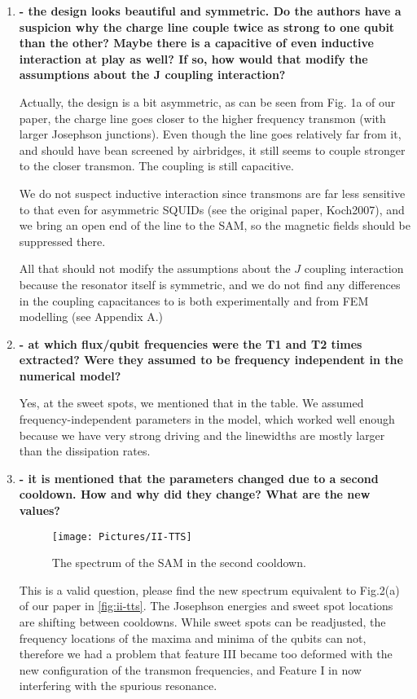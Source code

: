\documentclass{article}
\begin{document}
\begin{enumerate}
	\item \textbf{- the design looks beautiful and symmetric. Do the authors have a
	suspicion why the charge line couple twice as strong to one qubit than
	the other? Maybe there is a capacitive of even inductive interaction
	at play as well? If so, how would that modify the assumptions about
	the J coupling interaction?}
	
	Actually, the design is a bit asymmetric, as can be seen from Fig. 1a of our paper, the charge line goes closer to the higher frequency transmon (with larger Josephson junctions). Even though the line goes relatively far from it, and should have bean screened by airbridges, it still seems to couple stronger to the closer transmon. The coupling is still capacitive. 
	
	We do not suspect inductive interaction since transmons are far less sensitive to that even for asymmetric SQUIDs (see the original paper, Koch2007), and we bring an open end of the line to the SAM, so the magnetic fields should be suppressed there.
	
	All that should not modify the assumptions about
	the $J$ coupling interaction because the resonator itself is symmetric, and we do not find any differences in the coupling capacitances to is both experimentally and from FEM modelling (see Appendix A.)
	
	\item \textbf{- at which flux/qubit frequencies were the T1 and T2 times extracted?
		Were they assumed to be frequency independent in the numerical model?}
	
	Yes, at the sweet spots, we mentioned that in the table. We assumed frequency-independent parameters in the model, which worked well enough because we have very strong driving and the linewidths are mostly larger than the dissipation rates.
	
	\item \textbf{- it is mentioned that the parameters changed due to a second
		cooldown. How and why did they change? What are the new values?}
	
	\begin{figure}
		\centering
		\texttt{[image: Pictures/II-TTS]}
		\caption{The spectrum of the SAM in the second cooldown.}
		\label{fig:ii-tts}
	\end{figure}
	
	
	This is a valid question, please find the new spectrum equivalent to Fig.2(a) of our paper in \autoref{fig:ii-tts}. The Josephson energies and sweet spot locations are shifting between cooldowns. While sweet spots can be readjusted, the frequency locations of the maxima and minima of the qubits can not, therefore we had a problem that feature III became too deformed with the new configuration of the transmon frequencies, and Feature I in now interfering with the spurious resonance. 
	

\end{enumerate}
\end{document}
